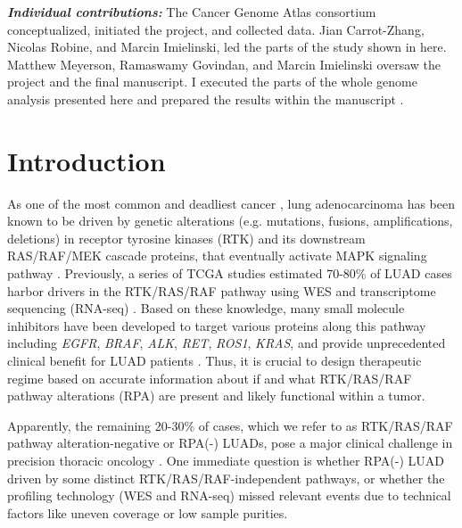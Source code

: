 \documentclass[phd,tocprelim]{cornell}
\begin{document}
\textit{\textbf{Individual contributions:}} The Cancer Genome Atlas consortium conceptualized, initiated the project, and collected data. Jian Carrot-Zhang, Nicolas Robine, and Marcin Imielinski, led the parts of the study shown in here. Matthew Meyerson, Ramaswamy Govindan, and Marcin Imielinski oversaw the project and the final manuscript. I executed the parts of the whole genome analysis presented here and prepared the results within the manuscript \cite{Carrot-Zhang2020-vl}.


\section{Introduction}
As one of the most common and deadliest cancer \cite{Siegel2019-gb}, lung adenocarcinoma has been known to be driven by genetic alterations (e.g. mutations, fusions, amplifications, deletions) in receptor tyrosine kinases (RTK) and its downstream RAS/RAF/MEK cascade proteins, that eventually activate MAPK signaling pathway \cite{Desai2014-qe}. Previously, a series of TCGA studies estimated 70-80\% of LUAD cases harbor drivers in the RTK/RAS/RAF pathway using WES and transcriptome sequencing (RNA-seq) \cite{Campbell2016-xv,Cancer_Genome_Atlas_Research_Network2014-ju,Imielinski2012-vv}. Based on these knowledge, many small molecule inhibitors have been developed to target various proteins along this pathway including \textit{EGFR}, \textit{BRAF}, \textit{ALK}, \textit{RET}, \textit{ROS1}, \textit{KRAS}, and provide unprecedented clinical benefit for LUAD patients \cite{Zhong2021-st}. Thus, it is crucial to design therapeutic regime based on accurate information about if and what RTK/RAS/RAF pathway alterations (RPA) are present and likely functional within a tumor.


Apparently, the remaining 20-30\% of cases, which we refer to as RTK/RAS/RAF pathway alteration-negative or RPA(-) LUADs, pose a major clinical challenge in precision thoracic oncology \cite{Campbell2016-xv}. One immediate question is whether RPA(-) LUAD driven by some distinct RTK/RAS/RAF-independent pathways, or whether the profiling technology (WES and RNA-seq) missed relevant events due to technical factors like uneven coverage or low sample purities. 
\end{document}
